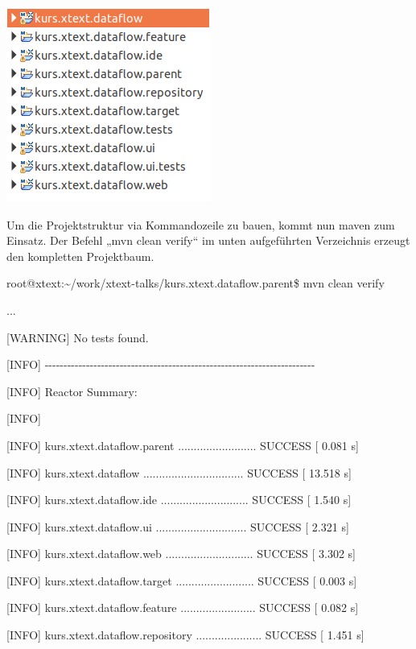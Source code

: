 \documentclass[]{article}
\begin{document}
\includegraphics[width=2.63540in,height=2.53110in]{./Pictures/10000201000000FD000000F33F19609DDE80FED7.png}

Um die Projektstruktur via Kommandozeile zu bauen, kommt nun maven zum
Einsatz. Der Befehl „mvn clean verify`` im unten aufgeführten
Verzeichnis erzeugt den kompletten Projektbaum.

root@xtext:\textasciitilde{}/work/xtext-talks/kurs.xtext.dataflow.parent\$
mvn clean verify

...

{[}WARNING{]} No tests found.

{[}INFO{]}
-\/-\/-\/-\/-\/-\/-\/-\/-\/-\/-\/-\/-\/-\/-\/-\/-\/-\/-\/-\/-\/-\/-\/-\/-\/-\/-\/-\/-\/-\/-\/-\/-\/-\/-\/-\/-\/-\/-\/-\/-\/-\/-\/-\/-\/-\/-\/-\/-\/-\/-\/-\/-\/-\/-\/-\/-\/-\/-\/-\/-\/-\/-\/-\/-\/-\/-\/-\/-\/-\/-\/-

{[}INFO{]} Reactor Summary:

{[}INFO{]}

{[}INFO{]} kurs.xtext.dataflow.parent ......................... SUCCESS
{[} 0.081 s{]}

{[}INFO{]} kurs.xtext.dataflow ................................ SUCCESS
{[} 13.518 s{]}

{[}INFO{]} kurs.xtext.dataflow.ide ............................ SUCCESS
{[} 1.540 s{]}

{[}INFO{]} kurs.xtext.dataflow.ui ............................. SUCCESS
{[} 2.321 s{]}

{[}INFO{]} kurs.xtext.dataflow.web ............................ SUCCESS
{[} 3.302 s{]}

{[}INFO{]} kurs.xtext.dataflow.target ......................... SUCCESS
{[} 0.003 s{]}

{[}INFO{]} kurs.xtext.dataflow.feature ........................ SUCCESS
{[} 0.082 s{]}

{[}INFO{]} kurs.xtext.dataflow.repository ..................... SUCCESS
{[} 1.451 s{]}
\end{document}
